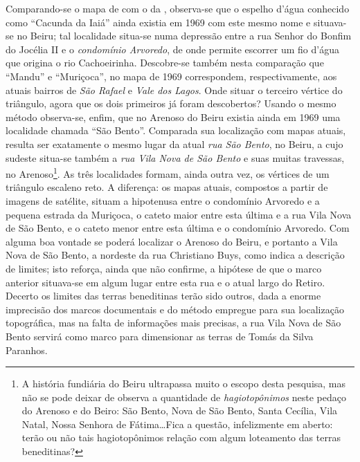 Comparando-se o mapa de  com o da , observa-se que o espelho d'água conhecido como ``Cacunda da Iaiá'' ainda existia em 1969 com este mesmo nome e situava-se no Beiru; tal localidade situa-se numa depressão entre a rua Senhor do Bonfim do Jocélia II e o \textit{condomínio Arvoredo}, de onde permite escorrer um fio d'água que origina o rio Cachoeirinha. Descobre-se também nesta comparação que ``Mandu'' e ``Muriçoca'',  no mapa de 1969 correspondem, respectivamente, aos atuais bairros de \textit{São Rafael} e \textit{Vale dos Lagos}. Onde situar o terceiro vértice do triângulo, agora que os dois primeiros já foram descobertos? Usando o mesmo método observa-se, enfim, que no Arenoso do Beiru existia ainda em 1969 uma localidade chamada ``São Bento''. Comparada sua localização com mapas atuais, resulta ser exatamente o mesmo lugar da atual \textit{rua São Bento}, no Beiru, a cujo sudeste situa-se também a \textit{rua Vila Nova de São Bento} e suas muitas travessas, no Arenoso\footnote{A história fundiária do Beiru ultrapassa muito o escopo desta pesquisa, mas não se pode deixar de observa a quantidade de \textit{hagiotopônimos} neste pedaço do Arenoso e do Beiro: São Bento, Nova de São Bento, Santa Cecília, Vila Natal, Nossa Senhora de Fátima\dots Fica a questão, infelizmente em aberto: terão ou não tais hagiotopônimos relação com algum loteamento das terras beneditinas?}. As três localidades formam, ainda outra vez, os vértices de um triângulo escaleno reto. A diferença: os mapas atuais, compostos a partir de imagens de satélite, situam a hipotenusa entre o condomínio Arvoredo e a pequena estrada da Muriçoca, o cateto maior entre esta última e a rua Vila Nova de São Bento, e o cateto menor entre esta última e o condomínio Arvoredo. Com alguma boa vontade se poderá localizar o Arenoso do Beiru, e portanto a Vila Nova de São Bento, a nordeste da rua Christiano Buys, como indica a descrição de limites; isto reforça, ainda que não confirme, a hipótese de que o marco anterior situava-se em algum lugar entre esta rua e o atual largo do Retiro. Decerto os limites das terras beneditinas terão sido outros, dada a enorme imprecisão dos marcos documentais e do método empregue para sua localização topográfica, mas na falta de informações mais precisas, a rua Vila Nova de São Bento servirá como marco para dimensionar as terras de Tomás da Silva Paranhos.

